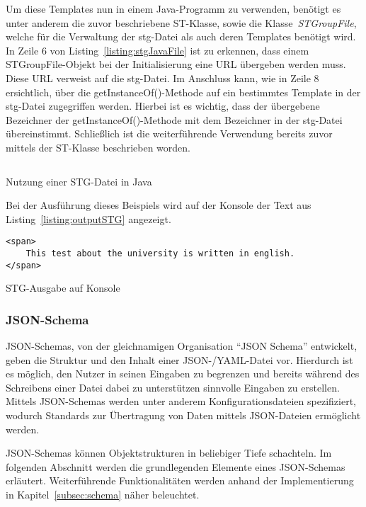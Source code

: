 Um diese Templates nun in einem Java-Programm zu verwenden, benötigt es unter anderem die zuvor beschriebene ST-Klasse, sowie
die Klasse~\textit{STGroupFile}, welche für die Verwaltung der stg-Datei als auch deren Templates benötigt wird.
In Zeile 6 von Listing~\ref{listing:stgJavaFile} ist zu erkennen, dass einem STGroupFile-Objekt bei der Initialisierung eine URL übergeben werden muss.
Diese URL verweist auf die stg-Datei.
Im Anschluss kann, wie in Zeile 8 ersichtlich, über die getInstanceOf()-Methode auf ein bestimmtes Template in der stg-Datei zugegriffen werden.
Hierbei ist es wichtig, dass der übergebene Bezeichner der getInstanceOf()-Methode mit dem Bezeichner in der stg-Datei übereinstimmt.
Schließlich ist die weiterführende Verwendung bereits zuvor mittels der ST-Klasse beschrieben worden.

\begin{listing}[!ht]
    \inputminted{java}{listings/2.2.1/JavaSTGExample.java}
    \caption{Nutzung einer STG-Datei in Java}
    \label{listing:stgJavaFile}
\end{listing}

Bei der Ausführung dieses Beispiels wird auf der Konsole der Text aus Listing~\ref{listing:outputSTG} angezeigt.

\begin{listing}[!ht]
    \begin{verbatim}
<span>
    This test about the university is written in english.
</span>
    \end{verbatim}
    \caption{STG-Ausgabe auf Konsole}
    \label{listing:outputSTG}
\end{listing}

\subsubsection{JSON-Schema}\label{subsubsec:json-schema}
JSON-Schemas, von der gleichnamigen Organisation ``JSON Schema'' entwickelt, geben die Struktur und den Inhalt einer JSON-/YAML-Datei vor\cite*{jsonSchema}.
Hierdurch ist es möglich, den Nutzer in seinen Eingaben zu begrenzen und bereits während des Schreibens einer Datei dabei zu unterstützen sinnvolle Eingaben zu erstellen.
Mittels JSON-Schemas werden unter anderem Konfigurationsdateien spezifiziert, wodurch Standards zur Übertragung von Daten mittels JSON-Dateien ermöglicht werden.

JSON-Schemas können Objektstrukturen in beliebiger Tiefe schachteln.
Im folgenden Abschnitt werden die grundlegenden Elemente eines JSON-Schemas erläutert.
Weiterführende Funktionalitäten werden anhand der Implementierung in Kapitel~\ref{subsec:schema} näher beleuchtet.

